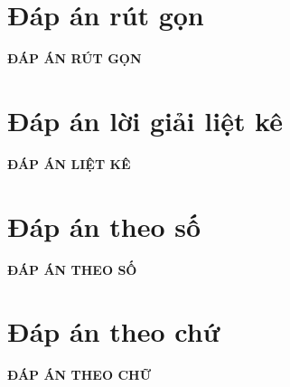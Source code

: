 \documentclass[12pt]{article}
\begin{document}
\newpage

\section{Đáp án rút gọn}
\thispagestyle{empty}
\indapanrutgon
\lamtieude
\begin{center}
{\bf ĐÁP ÁN RÚT GỌN}
\end{center}
\begin{multicols}{3}
\begin{enumerate}[\causo]
\foreachproblem[bttracnghiem]{\item\thisproblem}
\end{enumerate}
\end{multicols}
\newpage
\section{Đáp án lời giải liệt kê}
\thispagestyle{empty}
\setcounter{page}{1}
\indapanlietke
\lamtieude
\thispagestyle{empty}
\begin{center}
{\bf ĐÁP ÁN LIỆT KÊ}
\end{center}
\begin{multicols}{3}
\begin{enumerate}[\causo]
\foreachproblem[bttracnghiem]{\item\thisproblem}
\end{enumerate}
\end{multicols}

\newpage
\section{Đáp án theo số}
\thispagestyle{empty}
\setcounter{page}{1}
\khoanh{\cboxv}
\indapanso
\lamtieude
\begin{center}
{\bf ĐÁP ÁN THEO SỐ}
\end{center}
\chucauhoi{ }
\begin{center}
\begin{multicols}{6}
\begin{enumerate}[\causo]
\foreachproblem[bttracnghiem]{\item\thisproblem}
\end{enumerate}
\end{multicols}
\end{center}
\newpage
\section{Đáp án theo chứ}
\thispagestyle{empty}
\indapanchu
\lamtieude
\begin{center}
{\bf ĐÁP ÁN  THEO CHỮ}
\end{center}
\begin{center}
\begin{multicols}{10}
\begin{enumerate}[]
\foreachproblem[bttracnghiem]{\item\thisproblem}
\end{enumerate}
\end{multicols}
\end{center}
\newpage
\end{document}
